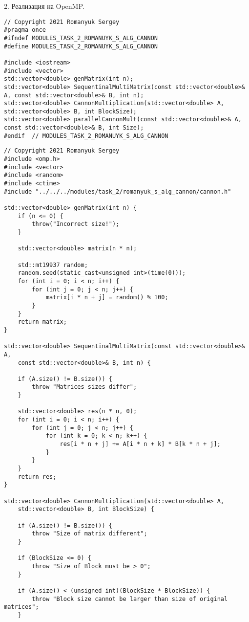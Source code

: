 \documentclass{report}
\begin{document}
\par 2. Реализация на OpenMP.
\begin{lstlisting}
// Copyright 2021 Romanyuk Sergey
#pragma once
#ifndef MODULES_TASK_2_ROMANUYK_S_ALG_CANNON
#define MODULES_TASK_2_ROMANUYK_S_ALG_CANNON

#include <iostream>
#include <vector>
std::vector<double> genMatrix(int n);
std::vector<double> SequentinalMultiMatrix(const std::vector<double>& A, const std::vector<double>& B, int n);
std::vector<double> CannonMultiplication(std::vector<double> A, std::vector<double> B, int BlockSize);
std::vector<double> parallelCannonMult(const std::vector<double>& A, const std::vector<double>& B, int Size);
#endif  // MODULES_TASK_2_ROMANUYK_S_ALG_CANNON
\end{lstlisting}
\begin{lstlisting}
// Copyright 2021 Romanyuk Sergey
#include <omp.h>
#include <vector>
#include <random>
#include <ctime>
#include "../../../modules/task_2/romanyuk_s_alg_cannon/cannon.h"

std::vector<double> genMatrix(int n) {
    if (n <= 0) {
        throw("Incorrect size!");
    }

    std::vector<double> matrix(n * n);

    std::mt19937 random;
    random.seed(static_cast<unsigned int>(time(0)));
    for (int i = 0; i < n; i++) {
        for (int j = 0; j < n; j++) {
            matrix[i * n + j] = random() % 100;
        }
    }
    return matrix;
}

std::vector<double> SequentinalMultiMatrix(const std::vector<double>& A,
    const std::vector<double>& B, int n) {

    if (A.size() != B.size()) {
        throw "Matrices sizes differ";
    }

    std::vector<double> res(n * n, 0);
    for (int i = 0; i < n; i++) {
        for (int j = 0; j < n; j++) {
            for (int k = 0; k < n; k++) {
                res[i * n + j] += A[i * n + k] * B[k * n + j];
            }
        }
    }
    return res;
}

std::vector<double> CannonMultiplication(std::vector<double> A,
    std::vector<double> B, int BlockSize) {

    if (A.size() != B.size()) {
        throw "Size of matrix different";
    }

    if (BlockSize <= 0) {
        throw "Size of Block must be > 0";
    }

    if (A.size() < (unsigned int)(BlockSize * BlockSize)) {
        throw "Block size cannot be larger than size of original matrices";
    }


\end{lstlisting}
\end{document}
